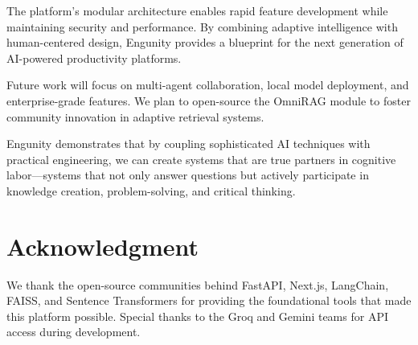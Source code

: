 \documentclass[conference]{IEEEtran}
\begin{document}
The platform's modular architecture enables rapid feature development while maintaining security and performance. By combining adaptive intelligence with human-centered design, Engunity provides a blueprint for the next generation of AI-powered productivity platforms.

Future work will focus on multi-agent collaboration, local model deployment, and enterprise-grade features. We plan to open-source the OmniRAG module to foster community innovation in adaptive retrieval systems.

Engunity demonstrates that by coupling sophisticated AI techniques with practical engineering, we can create systems that are true partners in cognitive labor—systems that not only answer questions but actively participate in knowledge creation, problem-solving, and critical thinking.

\section*{Acknowledgment}

We thank the open-source communities behind FastAPI, Next.js, LangChain, FAISS, and Sentence Transformers for providing the foundational tools that made this platform possible. Special thanks to the Groq and Gemini teams for API access during development.
\end{document}
